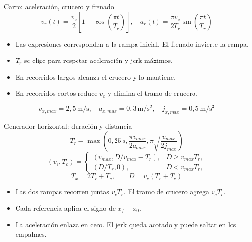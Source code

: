 \documentclass[aspectratio=169,11pt]{beamer}
\begin{document}
\begin{frame}[t,label=trayectoria2]{Carro: aceleración, crucero y frenado}
\[
v_r(t)=\frac{v_c}{2}\left[1-\cos\left(\frac{\pi t}{T_r}\right)\right],\quad
a_r(t)=\frac{\pi v_c}{2T_r}\sin\left(\frac{\pi t}{T_r}\right)
\]
\begin{itemize}
\item Las expresiones corresponden a la rampa inicial. El frenado invierte la rampa.
\item $T_r$ se elige para respetar aceleración y jerk máximos.
\item En recorridos largos alcanza el crucero y lo mantiene.
\item En recorridos cortos reduce $v_c$ y elimina el tramo de crucero.
\end{itemize}
\[ v_{x,max}=2{,}5\ \mathrm{m/s},\quad a_{x,max}=0{,}3\ \mathrm{m/s^2},\quad j_{x,max}=0{,}5\ \mathrm{m/s^3} \]

\end{frame}
\begin{frame}[t,label=horizontalcalculo]{Generador horizontal: duración y distancia}
\relax
{\small
\[
T_r=\max\left(0{,}25\ \mathrm s,\frac{\pi v_{max}}{2a_{max}},
\pi\sqrt{\frac{v_{max}}{2j_{max}}}\right)
\]
\[
(v_c,T_c)=\begin{cases}(v_{max},D/v_{max}-T_r),&D\geq v_{max}T_r,\\
(D/T_r,0),&D<v_{max}T_r,\end{cases}
\]
\[
T_x=2T_r+T_c,\qquad D=v_c(T_r+T_c)
\]
}
\begin{itemize}
\item Las dos rampas recorren juntas $v_cT_r$. El tramo de crucero agrega $v_cT_c$.
\item Cada referencia aplica el signo de $x_f-x_0$.
\item La aceleración enlaza en cero. El jerk queda acotado y puede saltar en los empalmes.
\end{itemize}
\end{frame}
\end{document}
